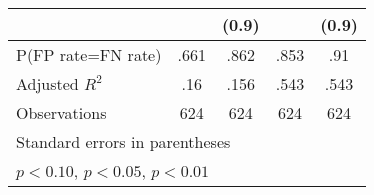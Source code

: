 \begin{table}[htbp]
\begin{tabular}{l*{4}{c}}
                &                  &    (0.9)         &                  &    (0.9)         \\
\hline
P(FP rate=FN rate)&     .661         &     .862         &     .853         &      .91         \\
Adjusted \(R^{2}\)&      .16         &     .156         &     .543         &     .543         \\
Observations    &      624         &      624         &      624         &      624         \\
\hline\hline
\multicolumn{5}{l}{\footnotesize Standard errors in parentheses}\\
\multicolumn{5}{l}{\footnotesize \sym{*} \(p<0.10\), \sym{**} \(p<0.05\), \sym{***} \(p<0.01\)}\\
\end{tabular}
\end{table}
